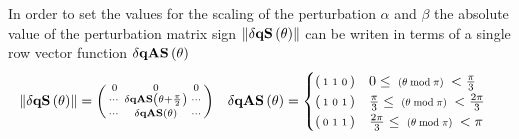 In order to set the values for the scaling of the perturbation $\alpha$ and $\beta$ the absolute value of the perturbation matrix sign $\left\lVert \dqs[\theta] \right\rVert$ can be writen in terms of a single row vector function $\dqas[\theta]$ 
\begin{align*}
\left\lVert \dqs[\theta] \right\rVert & = 
\left( \begin{smallmatrix}  0&0&0   \\   \cdots & \dqas[\theta + \frac{\pi}{2}] & \cdots   \\  \cdots & \dqas[\theta]   & \cdots  \\ \end{smallmatrix}  \right) 
&
\dqas[\theta] &=\begin{cases}
\left(\begin{smallmatrix} 1 & 1 & 0 \end{smallmatrix} \right)&  0                     \leq \scalebox{0.75}{ $(\theta \bmod \pi )$ }<\frac{   \pi }{3} \\
\left(\begin{smallmatrix} 1 & 0 & 1 \end{smallmatrix} \right)&  \frac{   \pi }{3}\leq \scalebox{0.75}{ $(\theta \bmod \pi )$ }<\frac{2 \pi }{3} \\
\left(\begin{smallmatrix} 0 & 1 & 1 \end{smallmatrix} \right) & \frac{2 \pi }{3}\leq \scalebox{0.75}{ $(\theta \bmod \pi )$ }<\pi  \\
\end{cases} 
\end{align*}
